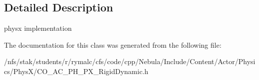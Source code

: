 \subsection{Detailed Description}
physx implementation 

The documentation for this class was generated from the following file:\begin{DoxyCompactItemize}
\item 
/nfs/stak/students/r/rymalc/cfs/code/cpp/Nebula/Include/Content/Actor/Physics/PhysX/CO\_\-AC\_\-PH\_\-PX\_\-RigidDynamic.h\end{DoxyCompactItemize}
